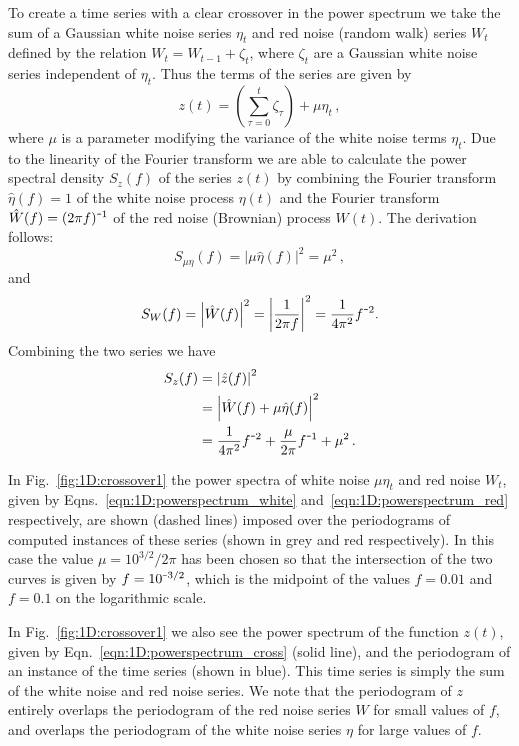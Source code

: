 \documentclass[10pt]{iopart}
\newcommand{\m}{\textup{\texttt{-}}}
\newcommand{\revision}[1]{\color{red} {#1}}
\begin{document}
To create a time series with a clear crossover in the power spectrum we take the sum of a Gaussian white noise series $\eta_t$ and red noise (random walk) series $W_t$ defined by the relation $W_t = W_{t-1} + \zeta_t$, where $\zeta_t$ are a Gaussian white noise series independent of $\eta_t$. Thus the terms of the series are given by
\begin{equation}
	\label{eqn:1D:crossoverfunction}
	z(t) = \left(\sum_{\tau=0}^t \zeta_\tau\right) + \mu\eta_t\,,
\end{equation}
where $\mu$ is a parameter modifying the variance of the white noise terms $\eta_t$. Due to the linearity of the Fourier transform {\revision we are able to calculate the power spectral density $S_z(f)$ of the series $z(t)$ by combining the Fourier transform $\hat{\eta}(f)=1$ of the white noise process $\eta(t)$ and the Fourier transform $\hat{W}(f) = (2\pi f)^{\m1}$ of the red noise (Brownian) process $W(t)$. The derivation follows}:
\begin{equation}
	\label{eqn:1D:powerspectrum_white}
	S_{\mu\eta}(f) = \left| \mu\hat{\eta}(f) \right|^2 = \mu^2\,,
\end{equation}
and
\begin{equation}
	\label{eqn:1D:powerspectrum_red}
	S_{W}(f) = \left| \hat{W}(f) \right|^2 = \left|\frac{1}{2\pi f}\right|^2 = \frac{1}{4\pi^2}f^{\m2}.
\end{equation}
Combining the two series we have
\begin{eqnarray}
		S_z(f) &= \left| \hat{z}(f) \right|^2\nonumber\\
		&= \left| \hat{W}(f) + \mu\hat{\eta}(f) \right|^2\nonumber\\
		\label{eqn:1D:powerspectrum_cross}
		&= \frac{1}{4\pi^2}f^{\m2} + \frac{\mu}{2\pi}f^{\m1} + \mu^2\,.
\end{eqnarray}

In Fig.~\ref{fig:1D:crossover1} the power spectra of white noise $\mu\eta_t$ and red noise $W_t$, given by Eqns.~\ref{eqn:1D:powerspectrum_white} and~\ref{eqn:1D:powerspectrum_red} respectively, are shown (dashed lines) imposed over the periodograms of computed instances of these series (shown in grey and red respectively). In this case the value $\mu = 10^{3/2}/2\pi$ has been chosen so that the intersection of the two curves is given by $f = 10^{\m3/2}$, which is the midpoint of the values $f=0.01$ and $f=0.1$ on the logarithmic scale. 

In Fig.~\ref{fig:1D:crossover1} we also see the power spectrum of the function $z(t)$, given by Eqn.~\ref{eqn:1D:powerspectrum_cross} (solid line), and the periodogram of an instance of the time series (shown in blue). This time series is simply the sum of the white noise and red noise series. We note that the periodogram of $z$ entirely overlaps the periodogram of the red noise series $W$ for small values of $f$, and overlaps the periodogram of the white noise series $\eta$ for large values of $f$. 
\end{document}
